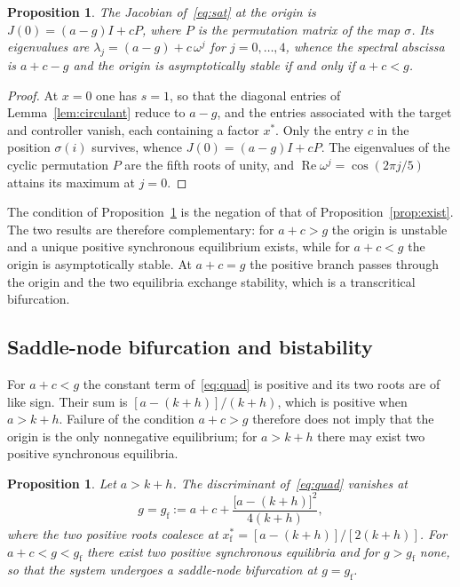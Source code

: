 \documentclass[11pt]{article}
\newtheorem{proposition}[theorem]{Proposition}
\theoremstyle{definition}
\theoremstyle{remark}
\begin{document}
	\begin{proposition}\label{prop:origin}
		The Jacobian of~\eqref{eq:sat} at the origin is $J(0)=(a-g)I+cP$, where $P$ is the
		permutation matrix of the map $\sigma$. Its eigenvalues are
		$\lambda_j=(a-g)+c\,\omega^{j}$ for $j=0,\dots,4$, whence the spectral abscissa is
		$a+c-g$ and the origin is asymptotically stable if and only if $a+c<g$.
	\end{proposition}
	
	\begin{proof}
		At $x=0$ one has $s=1$, so that the diagonal entries of Lemma~\ref{lem:circulant}
		reduce to $a-g$, and the entries associated with the target and controller vanish,
		each containing a factor $x^\ast$. Only the entry $c$ in the position $\sigma(i)$
		survives, whence $J(0)=(a-g)I+cP$. The eigenvalues of the cyclic permutation $P$ are
		the fifth roots of unity, and $\operatorname{Re}\omega^{j}=\cos(2\pi j/5)$ attains
		its maximum at $j=0$.
	\end{proof}
	
	The condition of Proposition~\ref{prop:origin} is the negation of that of
	Proposition~\ref{prop:exist}. The two results are therefore complementary: for
	$a+c>g$ the origin is unstable and a unique positive synchronous equilibrium exists,
	while for $a+c<g$ the origin is asymptotically stable. At $a+c=g$ the positive branch
	passes through the origin and the two equilibria exchange stability, which is a
	transcritical bifurcation.
	
	\subsection{Saddle-node bifurcation and bistability}\label{sec:bistability}
	
	For $a+c<g$ the constant term of~\eqref{eq:quad} is positive and its two roots are
	of like sign. Their sum is $[a-(k+h)]/(k+h)$, which is positive when $a>k+h$.
	Failure of the condition $a+c>g$ therefore does not imply that the origin is the
	only nonnegative equilibrium; for $a>k+h$ there may exist two positive synchronous
	equilibria.
	
	\begin{proposition}\label{prop:fold}
		Let $a>k+h$. The discriminant of~\eqref{eq:quad} vanishes at
		\begin{equation}\label{eq:gfold}
			g=g_{\mathrm f}:=a+c+\frac{\bigl[a-(k+h)\bigr]^{2}}{4(k+h)},
		\end{equation}
		where the two positive roots coalesce at
		$x^\ast_{\mathrm f}=[a-(k+h)]/[2(k+h)]$. For $a+c<g<g_{\mathrm f}$ there exist two
		positive synchronous equilibria and for $g>g_{\mathrm f}$ none, so that the system
		undergoes a saddle-node bifurcation at $g=g_{\mathrm f}$.
	\end{proposition}
	
\end{document}
